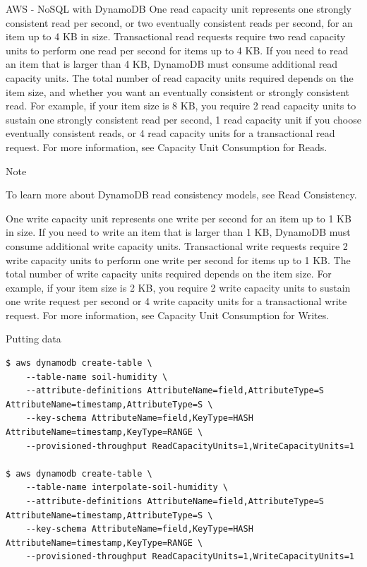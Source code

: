 \begin{frame}{AWS - NoSQL with DynamoDB}
    One read capacity unit represents one strongly consistent read per second, or two eventually consistent reads per second, for an item up to 4 KB in size. Transactional read requests require two read capacity units to perform one read per second for items up to 4 KB. If you need to read an item that is larger than 4 KB, DynamoDB must consume additional read capacity units. The total number of read capacity units required depends on the item size, and whether you want an eventually consistent or strongly consistent read. For example, if your item size is 8 KB, you require 2 read capacity units to sustain one strongly consistent read per second, 1 read capacity unit if you choose eventually consistent reads, or 4 read capacity units for a transactional read request. For more information, see Capacity Unit Consumption for Reads.

Note

To learn more about DynamoDB read consistency models, see Read Consistency.

One write capacity unit represents one write per second for an item up to 1 KB in size. If you need to write an item that is larger than 1 KB, DynamoDB must consume additional write capacity units. Transactional write requests require 2 write capacity units to perform one write per second for items up to 1 KB. The total number of write capacity units required depends on the item size. For example, if your item size is 2 KB, you require 2 write capacity units to sustain one write request per second or 4 write capacity units for a transactional write request. For more information, see Capacity Unit Consumption for Writes.



Putting data

\begin{lstlisting}
$ aws dynamodb create-table \
    --table-name soil-humidity \
    --attribute-definitions AttributeName=field,AttributeType=S AttributeName=timestamp,AttributeType=S \
    --key-schema AttributeName=field,KeyType=HASH AttributeName=timestamp,KeyType=RANGE \
    --provisioned-throughput ReadCapacityUnits=1,WriteCapacityUnits=1

$ aws dynamodb create-table \
    --table-name interpolate-soil-humidity \
    --attribute-definitions AttributeName=field,AttributeType=S AttributeName=timestamp,AttributeType=S \
    --key-schema AttributeName=field,KeyType=HASH AttributeName=timestamp,KeyType=RANGE \
    --provisioned-throughput ReadCapacityUnits=1,WriteCapacityUnits=1


\end{lstlisting}
\end{frame}
